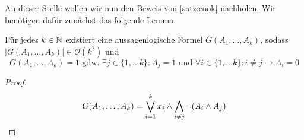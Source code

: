 
An dieser Stelle wollen wir nun den Beweis von \autoref{satz:cook} nachholen.
Wir benötigen dafür zunächst das folgende Lemma.
\begin{lemma}
	Für jedes $k\in\mathbb{N}$ existiert eine aussagenlogische Formel $G(A_1,\dots,A_k)$, sodass $|G(A_1,\dots,A_k)| \in \mathcal{O}(k^2)$ und
	\[
	G(A_1,\dots,A_k)=1 \text{\ \ gdw. \ \ }\exists j\in\{1,\ldots k\}: A_j = 1 \text{ und }\forall i\in\{1,\ldots k\}: i\neq j \rightarrow A_i = 0
	\]
\end{lemma}
\begin{proof}
	\[ 
	G(A_1,\dots,A_k) = \bigvee_{i=1}^k x_i\land \bigwedge_{i\neq j}\neg (A_i\land A_j) \qedhere
	\]
\end{proof}

